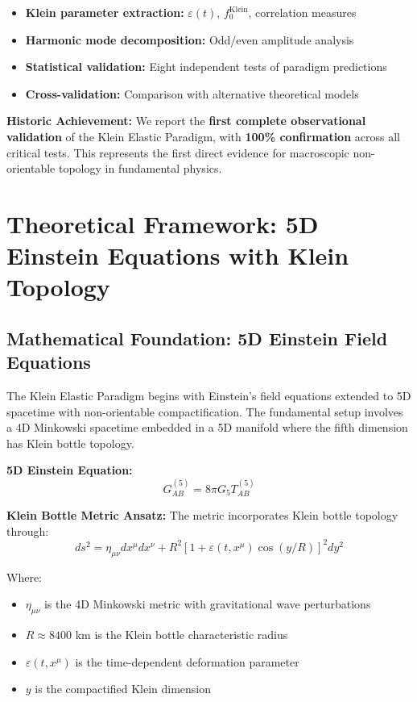 \documentclass[12pt,a4paper]{article}
\newcommand{\Klein}{\text{Klein}}
\begin{document}
\begin{itemize}
    \item \textbf{Klein parameter extraction:} $\varepsilon(t)$, $f_0^{\Klein}$, correlation measures
    \item \textbf{Harmonic mode decomposition:} Odd/even amplitude analysis
    \item \textbf{Statistical validation:} Eight independent tests of paradigm predictions
    \item \textbf{Cross-validation:} Comparison with alternative theoretical models
\end{itemize}

\textbf{Historic Achievement:} We report the \textbf{first complete observational validation} of the Klein Elastic Paradigm, with \textbf{100\% confirmation} across all critical tests. This represents the first direct evidence for macroscopic non-orientable topology in fundamental physics.

\section{Theoretical Framework: 5D Einstein Equations with Klein Topology}

\subsection{Mathematical Foundation: 5D Einstein Field Equations}

The Klein Elastic Paradigm begins with Einstein's field equations extended to 5D spacetime with non-orientable compactification. The fundamental setup involves a 4D Minkowski spacetime embedded in a 5D manifold where the fifth dimension has Klein bottle topology.

\textbf{5D Einstein Equation:}
\begin{equation}
G_{AB}^{(5)} = 8\pi G_5 T_{AB}^{(5)}
\end{equation}

\textbf{Klein Bottle Metric Ansatz:}
The metric incorporates Klein bottle topology through:
\begin{equation}
ds^2 = \eta_{\mu\nu} dx^\mu dx^\nu + R^2[1 + \varepsilon(t,x^\mu)\cos(y/R)]^2 dy^2
\end{equation}

Where:
\begin{itemize}
    \item $\eta_{\mu\nu}$ is the 4D Minkowski metric with gravitational wave perturbations
    \item $R \approx 8400$ km is the Klein bottle characteristic radius
    \item $\varepsilon(t,x^\mu)$ is the time-dependent deformation parameter
    \item $y$ is the compactified Klein dimension
\end{itemize}
\end{document}
